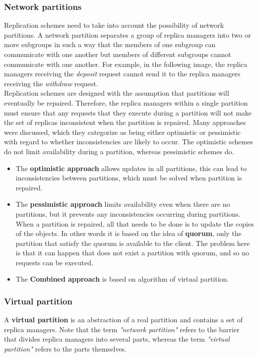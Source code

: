 \subsubsection{Network partitions}
Replication schemes need to take into account the possibility of network partitions. A
network partition separates a group of replica managers into two or more subgroups in
such a way that the members of one subgroup can communicate with one another but
members of different subgroups cannot communicate with one another. For example, in the following image, the replica managers receiving the \textit{deposit} request cannot send it to the replica managers receiving the \textit{withdraw} request.\\
Replication schemes are designed with the assumption that partitions will eventually be repaired. Therefore, the replica managers within a single partition must ensure that any requests that they execute during a partition will not make the set of replicas inconsistent when the partition is repaired.
Many approaches were discussed, which they categorize as being either optimistic or pessimistic with regard to whether inconsistencies are likely to occur. The optimistic schemes do not limit availability during a partition, whereas pessimistic schemes do.
\begin{itemize}
	\item The \textbf{optimistic approach} allows updates in all partitions, this can lead to inconsistencies between partitions, which must be solved when partition is repaired.
	
	\item The \textbf{pessimistic approach} limits availability even when there are no partitions, but it prevents any inconsistencies occurring during partitions. When a partition is repaired, all that needs to be done is to update the copies of the objects. In other words it is based on the idea of \textbf{quorum}, only the partition that satisfy the quorum is available to the client. The problem here is that it can happen that does not exist a partition with quorum, and so no requests can be executed.
	
	\item The \textbf{Combined approach} is based on algorithm of virtual partition.
\end{itemize}

\subsubsection{Virtual partition}
A \textbf{virtual partition} is an abstraction of a real partition and contains a set of replica managers. Note that the term \textit{"network partition"} refers to the barrier that divides replica managers into several parts, whereas the term \textit{"virtual partition"} refers to the parts themselves.

